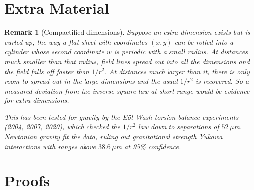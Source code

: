\documentclass{article}
\newtheorem{remark}{Remark}
\begin{document}
\section{Extra Material}
\begin{remark}[Compactified dimensions]
    Suppose an extra dimension exists but is curled up, the way a flat sheet with coordinates $(x,y)$ can be rolled into a cylinder whose second coordinate $w$ is periodic with a small radius. At distances much smaller than that radius, field lines spread out into all the dimensions and the field falls off faster than $1/r^2$. At distances much larger than it, there is only room to spread out in the large dimensions and the usual $1/r^2$ is recovered. So a measured deviation from the inverse square law at short range would be evidence for extra dimensions.\par
    This has been tested for gravity by the E\"ot-Wash torsion balance experiments (2004, 2007, 2020), which checked the $1/r^2$ law down to separations of $52\,\mu$m. Newtonian gravity fit the data, ruling out gravitational strength Yukawa interactions with ranges above $38.6\,\mu$m at 95\% confidence.
\end{remark}


\section{Proofs}
\end{document}
